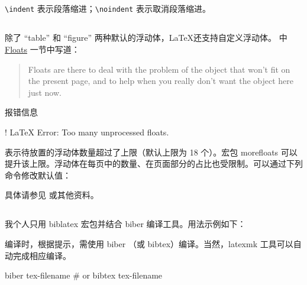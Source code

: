 \subsection{}
\verb+\indent+ 表示段落缩进；\verb+\noindent+ 表示取消段落缩进。

\subsection{}
除了 ``table'' 和 ``figure'' 两种默认的浮动体，\LaTeX 还支持自定义浮动体。\cite{wiki:floats} 中 \href{https://en.wikibooks.org/wiki/LaTeX/Floats,\_Figures\_and\_Captions\#Floats}{Floats} 一节中写道：
\begin{quote}
  Floats are there to deal with the problem of the object that won't fit on the present page, and to help when you really don't want the object here just now. 
\end{quote}

报错信息
\begin{bashlst}
! LaTeX Error: Too many unprocessed floats.
\end{bashlst}
表示待放置的浮动体数量超过了上限（默认上限为 18 个）。宏包 morefloats 可以提升该上限。浮动体在每页中的数量、在页面部分的占比也受限制。可以通过下列命令修改默认值：
\begin{texlst}
\setcounter{topnumber}{2}
\setcounter{bottomnumber}{2}
\setcounter{totalnumber}{4}
\renewcommand{\topfraction}{0.85}
\renewcommand{\bottomfraction}{0.85}
\renewcommand{\textfraction}{0.15}
\renewcommand{\floatpagefraction}{0.7}
\end{texlst}
具体请参见 \cite{placement} 或其他资料。

\subsection{}
我个人只用 biblatex 宏包并结合 biber 编译工具。用法示例如下：
\begin{texlst}
\usepackage[]{biblatex}


\printbibliography[]
\end{texlst}
编译时，根据提示，需使用 biber （或 bibtex）编译。当然，latexmk 工具可以自动完成相应编译。
\begin{bashlst}
biber tex-filename
# or bibtex tex-filename
\end{bashlst}